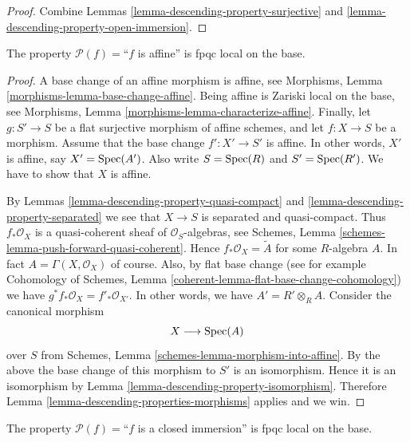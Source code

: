 \begin{proof}
Combine Lemmas \ref{lemma-descending-property-surjective}
and \ref{lemma-descending-property-open-immersion}.
\end{proof}

\begin{lemma}
\label{lemma-descending-property-affine}
The property $\mathcal{P}(f) =$``$f$ is affine''
is fpqc local on the base.
\end{lemma}

\begin{proof}
A base change of an affine morphism is affine, see
Morphisms, Lemma \ref{morphisms-lemma-base-change-affine}.
Being affine is Zariski local on the base, see
Morphisms, Lemma \ref{morphisms-lemma-characterize-affine}.
Finally, let
$g : S' \to S$ be a flat surjective morphism of affine schemes,
and let $f : X \to S$ be a morphism. Assume that the base change
$f' : X' \to S'$ is affine. In other words, $X'$ is affine, say
$X' = \mathop{\mathrm{Spec}}(A')$. Also write $S = \mathop{\mathrm{Spec}}(R)$
and $S' = \mathop{\mathrm{Spec}}(R')$. We have to show that $X$ is affine.

\medskip\noindent
By Lemmas \ref{lemma-descending-property-quasi-compact}
and \ref{lemma-descending-property-separated} we see that
$X \to S$ is separated and quasi-compact. Thus
$f_*\mathcal{O}_X$ is a quasi-coherent sheaf of $\mathcal{O}_S$-algebras,
see Schemes, Lemma \ref{schemes-lemma-push-forward-quasi-coherent}.
Hence $f_*\mathcal{O}_X = \widetilde{A}$ for some $R$-algebra $A$.
In fact $A = \Gamma(X, \mathcal{O}_X)$ of course.
Also, by flat base change
(see for example
Cohomology of Schemes, Lemma \ref{coherent-lemma-flat-base-change-cohomology})
we have $g^*f_*\mathcal{O}_X = f'_*\mathcal{O}_{X'}$.
In other words, we have $A' = R' \otimes_R A$.
Consider the canonical morphism
$$
X \longrightarrow \mathop{\mathrm{Spec}}(A)
$$
over $S$ from Schemes, Lemma \ref{schemes-lemma-morphism-into-affine}.
By the above the base change of this morphism to $S'$ is an isomorphism.
Hence it is an isomorphism by
Lemma \ref{lemma-descending-property-isomorphism}.
Therefore Lemma \ref{lemma-descending-properties-morphisms} applies and we win.
\end{proof}

\begin{lemma}
\label{lemma-descending-property-closed-immersion}
The property $\mathcal{P}(f) =$``$f$ is a closed immersion''
is fpqc local on the base.
\end{lemma}

